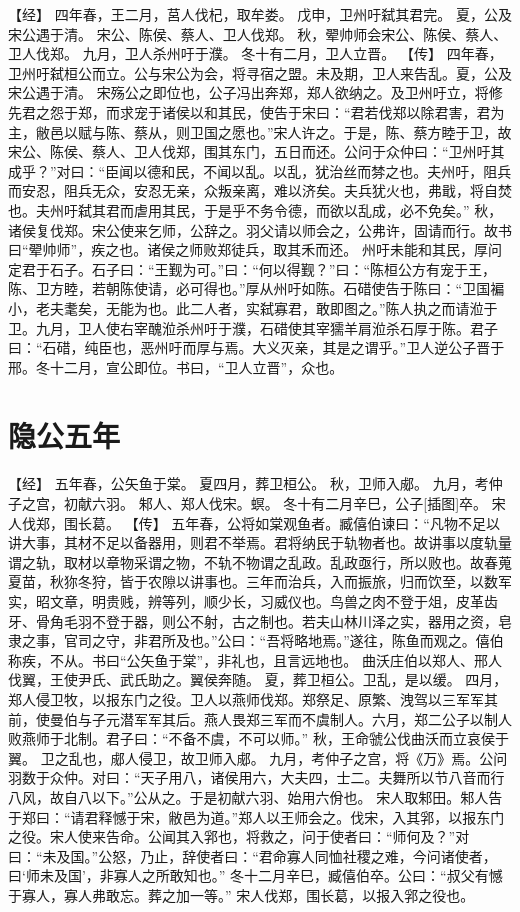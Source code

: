 \documentclass[a4paper,12pt,UTF8,twoside]{ctexbook}
\begin{document}
【经】
四年春，王二月，莒人伐杞，取牟娄。
戊申，卫州吁弑其君完。
夏，公及宋公遇于清。
宋公、陈侯、蔡人、卫人伐郑。
秋，翚帅师会宋公、陈侯、蔡人、卫人伐郑。
九月，卫人杀州吁于濮。
冬十有二月，卫人立晋。
【传】
四年春，卫州吁弑桓公而立。公与宋公为会，将寻宿之盟。未及期，卫人来告乱。夏，公及宋公遇于清。
宋殇公之即位也，公子冯出奔郑，郑人欲纳之。及卫州吁立，将修先君之怨于郑，而求宠于诸侯以和其民，使告于宋曰：“君若伐郑以除君害，君为主，敝邑以赋与陈、蔡从，则卫国之愿也。”宋人许之。于是，陈、蔡方睦于卫，故宋公、陈侯、蔡人、卫人伐郑，围其东门，五日而还。公问于众仲曰：“卫州吁其成乎？”对曰：“臣闻以德和民，不闻以乱。以乱，犹治丝而棼之也。夫州吁，阻兵而安忍，阻兵无众，安忍无亲，众叛亲离，难以济矣。夫兵犹火也，弗戢，将自焚也。夫州吁弑其君而虐用其民，于是乎不务令德，而欲以乱成，必不免矣。”
秋，诸侯复伐郑。宋公使来乞师，公辞之。羽父请以师会之，公弗许，固请而行。故书曰“翚帅师”，疾之也。诸侯之师败郑徒兵，取其禾而还。
州吁未能和其民，厚问定君于石子。石子曰：“王觐为可。”曰：“何以得觐？”曰：“陈桓公方有宠于王，陈、卫方睦，若朝陈使请，必可得也。”厚从州吁如陈。石碏使告于陈曰：“卫国褊小，老夫耄矣，无能为也。此二人者，实弑寡君，敢即图之。”陈人执之而请涖于卫。九月，卫人使右宰醜涖杀州吁于濮，石碏使其宰獳羊肩涖杀石厚于陈。君子曰：“石碏，纯臣也，恶州吁而厚与焉。大义灭亲，其是之谓乎。”卫人逆公子晋于邢。冬十二月，宣公即位。书曰，“卫人立晋”，众也。

\chapter{隐公五年}

【经】
五年春，公矢鱼于棠。
夏四月，葬卫桓公。
秋，卫师入郕。
九月，考仲子之宫，初献六羽。
邾人、郑人伐宋。螟。
冬十有二月辛巳，公子[插图]卒。
宋人伐郑，围长葛。
【传】
五年春，公将如棠观鱼者。臧僖伯谏曰：“凡物不足以讲大事，其材不足以备器用，则君不举焉。君将纳民于轨物者也。故讲事以度轨量谓之轨，取材以章物采谓之物，不轨不物谓之乱政。乱政亟行，所以败也。故春蒐夏苗，秋狝冬狩，皆于农隙以讲事也。三年而治兵，入而振旅，归而饮至，以数军实，昭文章，明贵贱，辨等列，顺少长，习威仪也。鸟兽之肉不登于俎，皮革齿牙、骨角毛羽不登于器，则公不射，古之制也。若夫山林川泽之实，器用之资，皂隶之事，官司之守，非君所及也。”公曰：“吾将略地焉。”遂往，陈鱼而观之。僖伯称疾，不从。书曰“公矢鱼于棠”，非礼也，且言远地也。
曲沃庄伯以郑人、邢人伐翼，王使尹氏、武氏助之。翼侯奔随。
夏，葬卫桓公。卫乱，是以缓。
四月，郑人侵卫牧，以报东门之役。卫人以燕师伐郑。郑祭足、原繁、洩驾以三军军其前，使曼伯与子元潜军军其后。燕人畏郑三军而不虞制人。六月，郑二公子以制人败燕师于北制。君子曰：“不备不虞，不可以师。”
秋，王命虢公伐曲沃而立哀侯于翼。
卫之乱也，郕人侵卫，故卫师入郕。
九月，考仲子之宫，将《万》焉。公问羽数于众仲。对曰：“天子用八，诸侯用六，大夫四，士二。夫舞所以节八音而行八风，故自八以下。”公从之。于是初献六羽、始用六佾也。
宋人取邾田。邾人告于郑曰：“请君释憾于宋，敝邑为道。”郑人以王师会之。伐宋，入其郛，以报东门之役。宋人使来告命。公闻其入郛也，将救之，问于使者曰：“师何及？”对曰：“未及国。”公怒，乃止，辞使者曰：“君命寡人同恤社稷之难，今问诸使者，曰‘师未及国’，非寡人之所敢知也。”
冬十二月辛巳，臧僖伯卒。公曰：“叔父有憾于寡人，寡人弗敢忘。葬之加一等。”
宋人伐郑，围长葛，以报入郛之役也。
\end{document}
